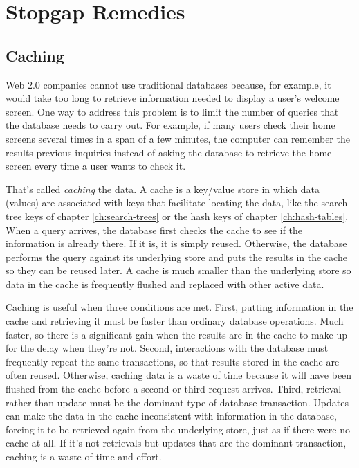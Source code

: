 \section{Stopgap Remedies}

\subsection{Caching}

Web 2.0 companies cannot use traditional databases
because, for example, it would take too long to retrieve information needed
to display a user's welcome screen.
One way to address this problem is to limit the number of queries that the
database needs to carry out.
For example, if many users check their home screens
several times in a span of a few minutes,
the computer can remember the results previous inquiries
instead of asking the database to
retrieve the home screen every time a user wants to check it.

That's called \emph{caching} the data.
A cache is a key/value store
in which data (values) are associated with keys
that facilitate locating the data,
like the search-tree keys of chapter \ref{ch:search-trees}
or the hash keys of chapter \ref{ch:hash-tables}.
When a query arrives, the database first checks
the cache to see if the information is already there.
If it is, it is simply reused.
Otherwise, the database performs the query against its underlying store
and puts the results in the cache so they can be reused later.
A cache is much smaller than the underlying store
so data in the cache is frequently flushed and replaced with other active data.

Caching is useful when three conditions are met.
First, putting information in the cache and retrieving it
must be faster than ordinary database operations.
Much faster, so there is a significant gain
when the results are in the cache to make up for the delay when they're not.
Second, interactions with the database must frequently repeat the same transactions,
so that results stored in the cache are often reused.
Otherwise, caching data is a waste of time because it will
have been flushed from the cache before a second or third request arrives.
Third, retrieval
rather than update must be the dominant type of database transaction.
Updates can make the data in the cache inconsistent with information in the database,
forcing it to be retrieved again from the underlying store,
just as if there were no cache at all.
If it's not retrievals but updates that are the dominant transaction,
caching is a waste of time and effort.

